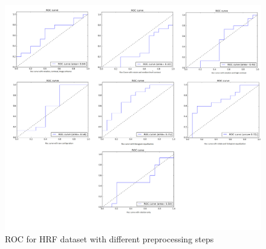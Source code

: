\begin{figure}[!htbbp]
\centering
\includegraphics[width=1.0\textwidth]{Figures/hrf.png}
\caption{ROC for HRF dataset with different preprocessing steps}
\label{hrfroc}
\end{figure}

